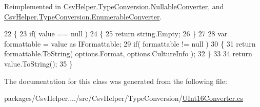 Reimplemented in \hyperlink{a00116_a7205cdb61d2d119582958232b3e63109}{Csv\-Helper.\-Type\-Conversion.\-Nullable\-Converter}, and \hyperlink{a00078_a7e07e9532857d748654d37db590a0e11}{Csv\-Helper.\-Type\-Conversion.\-Enumerable\-Converter}.


\begin{DoxyCode}
22         \{
23             \textcolor{keywordflow}{if}( value == null )
24             \{
25                 \textcolor{keywordflow}{return} string.Empty;
26             \}
27 
28             var formattable = value as IFormattable;
29             \textcolor{keywordflow}{if}( formattable != null )
30             \{
31                 \textcolor{keywordflow}{return} formattable.ToString( options.Format, options.CultureInfo );
32             \}
33 
34             \textcolor{keywordflow}{return} value.ToString();
35         \}
\end{DoxyCode}


The documentation for this class was generated from the following file\-:\begin{DoxyCompactItemize}
\item 
packages/\-Csv\-Helper..../src/\-Csv\-Helper/\-Type\-Conversion/\hyperlink{a00248}{U\-Int16\-Converter.\-cs}\end{DoxyCompactItemize}
